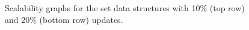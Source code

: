 \begin{figure}[tbp]
  \caption{Scalability graphs for the set data structures with 10\% (top row) and 20\% (bottom row) updates.}
  \label{fig:setdatastructures}
\end{figure}

